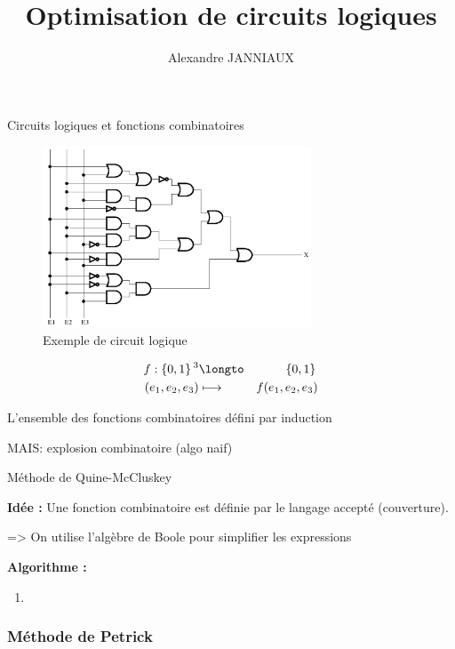 \documentclass[draft,handout]{beamer}
\title{Optimisation de circuits logiques}
\author{Alexandre JANNIAUX}
\newcommand{\ensemble}[1]{\left\lbrace{} #1 \right\rbrace{}}
\begin{document}
\begin{frame}
        \maketitle
        \tableofcontents
    \end{frame}

    \begin{frame}{Circuits logiques et fonctions combinatoires}
            \begin{figure}[p]
                \includegraphics[width=8cm]{images/circuit_logique.png}
                \caption{Exemple de circuit logique}
               \label{fig:circ1}
            \end{figure}

        \[ \begin{aligned}
                f: \ensemble{0,1}^3 &\longto & \ensemble{0,1} \\
                (e_1,e_2,e_3) & \longmapsto & f(e_1,e_2,e_3) 
            \end{aligned}
        \]

        L'ensemble des fonctions combinatoires défini par induction

        MAIS: explosion combinatoire (algo naif)

    \end{frame}

    \begin{frame}{M\'ethode de Quine-McCluskey}

        \large{\textbf{Idée :}} Une fonction combinatoire est définie par le langage accepté (couverture).

        => On utilise l'algèbre de Boole pour simplifier les expressions

        \large{\textbf{Algorithme :}}
            \begin{enumerate}
                \item 
            \end{enumerate}
    \end{frame}

    \begin{frame}
        \frametitle{M\'ethode de Petrick}

    \end{frame}
\end{document}
